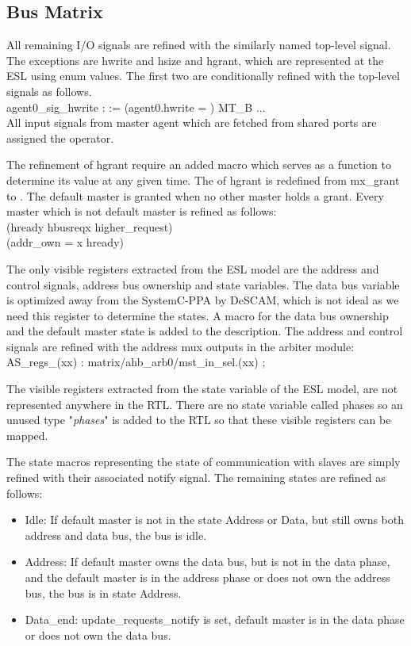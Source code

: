 \subsection{Bus Matrix}

All remaining I/O signals are refined with the similarly named top-level signal. The exceptions are hwrite and hsize and hgrant, which are represented at the ESL using enum values. The first two are conditionally refined with the top-level signals as follows.\\   
 agent0\_sig\_hwrite :  := (agent0.hwrite = )  MT\_B ...\\
All input signals from master agent which are fetched from shared ports are assigned the  operator. \par 
The refinement of hgrant require an added macro which serves as a function to determine its value at any given time. The  of hgrant is redefined from mx\_grant to . The default master is granted when no other master holds a grant. Every master which is not default master is refined as follows: \\
(hready  hbusreqx  higher\_request\ITLRW{)}) \\
(addr\_own = x hready\ITLKW{)})   \par
The only visible registers extracted from the ESL model are the address and control signals, address bus ownership and state variables. The data bus variable is optimized away from the SystemC-PPA by DeSCAM, which is not ideal as we need this register to determine the states. A macro for the data bus ownership and the default master state is added to the description. The address and control signals are refined with the address mux outputs in the arbiter module: \\
 AS\_regs\_(xx) : matrix/ahb\_arb0/mst\_in\_sel.(xx) ; \par
The visible registers extracted from the state variable of the ESL model, are not represented anywhere in the RTL. There are no state variable called phases so an unused type "\textit{phases}" is added to the RTL so that these visible registers can be mapped. \par
The state macros representing the state of communication with slaves are simply refined with their associated notify signal. The remaining states are refined as follows: 
\begin{itemize}
 \item Idle: If default master is not in the state Address or Data, but still owns both address and data bus, the bus is idle.
 \item Address: If default master owns the data bus, but is not in the data phase, and the default master is in the address phase or does not own the address bus, the bus is in state Address. 
 \item Data\_end: update\_requests\_notify is set, default master is in the data phase or does not own the data bus.  
\end{itemize}

